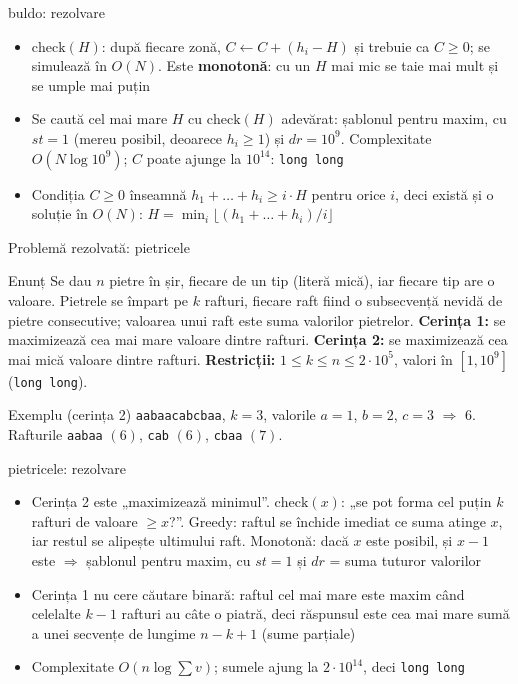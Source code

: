 \documentclass[8pt,mathserif]{beamer}
\begin{document}
\begin{frame}{buldo: rezolvare}
  \large
  \begin{itemize}
    \item $\mathrm{check}(H)$: după fiecare zonă, $C \leftarrow C + (h_i - H)$ și trebuie ca $C \ge 0$; se simulează în $O(N)$. Este \textbf{monotonă}: cu un $H$ mai mic se taie mai mult și se umple mai puțin
    \item Se caută cel mai mare $H$ cu $\mathrm{check}(H)$ adevărat: șablonul pentru maxim, cu $st = 1$ (mereu posibil, deoarece $h_i \ge 1$) și $dr = 10^9$. Complexitate $O(N \log 10^9)$; $C$ poate ajunge la $10^{14}$: \texttt{long long}
    \item Condiția $C \ge 0$ înseamnă $h_1 + \dots + h_i \ge i \cdot H$ pentru orice $i$, deci există și o soluție în $O(N)$: $H = \min_i \lfloor (h_1 + \dots + h_i)/i \rfloor$
  \end{itemize}
\end{frame}

\begin{frame}{Problemă rezolvată: pietricele }
  \large
  \begin{exampleblock}{Enunț}
    Se dau $n$ pietre în șir, fiecare de un tip (literă mică), iar fiecare tip are o valoare. Pietrele se împart pe $k$ rafturi, fiecare raft fiind o subsecvență nevidă de pietre consecutive; valoarea unui raft este suma valorilor pietrelor. \textbf{Cerința 1:} se maximizează cea mai mare valoare dintre rafturi. \textbf{Cerința 2:} se maximizează cea mai mică valoare dintre rafturi. \textbf{Restricții:} $1 \le k \le n \le 2 \cdot 10^5$, valori în $[1, 10^9]$ (\texttt{long long}).
  \end{exampleblock}
  \begin{block}{Exemplu (cerința 2)}
    \texttt{aabaacabcbaa}, $k = 3$, valorile $a = 1$, $b = 2$, $c = 3$ $\Longrightarrow$ $6$. Rafturile \texttt{aabaa} $(6)$, \texttt{cab} $(6)$, \texttt{cbaa} $(7)$.
  \end{block}
\end{frame}

\begin{frame}{pietricele: rezolvare}
  \large
  \begin{itemize}
    \item Cerința 2 este „maximizează minimul”. $\mathrm{check}(x)$: „se pot forma cel puțin $k$ rafturi de valoare $\ge x$?”. Greedy: raftul se închide imediat ce suma atinge $x$, iar restul se alipește ultimului raft. Monotonă: dacă $x$ este posibil, și $x - 1$ este $\Rightarrow$ șablonul pentru maxim, cu $st = 1$ și $dr$ = suma tuturor valorilor
    \item Cerința 1 nu cere căutare binară: raftul cel mai mare este maxim când celelalte $k - 1$ rafturi au câte o piatră, deci răspunsul este cea mai mare sumă a unei secvențe de lungime $n - k + 1$ (sume parțiale)
    \item Complexitate $O(n \log \sum v)$; sumele ajung la $2 \cdot 10^{14}$, deci \texttt{long long}
  \end{itemize}
\end{frame}
\end{document}
